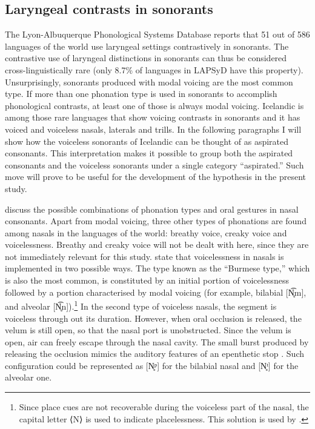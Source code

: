 \documentclass[11pt,a4paper,oneside,openany]{memoir}\usepackage[]{graphicx}\usepackage[]{color}
\begin{document}
\subsection{Laryngeal contrasts in sonorants}
The Lyon-Albuquerque Phonological Systems Database \citep{Maddieson2012} reports that 51 out of 586 languages of the world use laryngeal settings contrastively in sonorants.
The contrastive use of laryngeal distinctions in sonorants can thus be considered cross-linguistically rare (only 8.7\% of languages in LAPSyD have this property).
Unsurprisingly, sonorants produced with modal voicing are the most common type.
If more than one phonation type is used in sonorants to accomplish phonological contrasts, at least one of those is always modal voicing.
Icelandic is among those rare languages that show voicing contrasts in sonorants and it has voiced and voiceless nasals, laterals and trills.
In the following paragraphs I will show how the voiceless sonorants of Icelandic can be thought of as aspirated consonants.
This interpretation makes it possible to group both the aspirated consonants and the voiceless sonorants under a single category ``aspirated.''
Such move will prove to be useful for the development of the hypothesis in the present study.

\citet{ladefoged1996} discuss the possible combinations of phonation types and oral gestures in nasal consonants.
Apart from modal voicing, three other types of phonations are found among nasals in the languages of the world: breathy voice, creaky voice and voicelessness.
Breathy and creaky voice will not be dealt with here, since they are not immediately relevant for this study.
\citet{bhaskararao1991} state that voicelessness in nasals is implemented in two possible ways.
The type known as the ``Burmese type,'' which is also the most common, is constituted by an initial portion of voicelessness followed by a portion characterised by modal voicing (for example, bilabial [N̥͡m], and alveolar [N̥͡n]).\footnote{Since place cues are not recoverable during the voiceless part of the nasal, the capital letter ⟨N⟩ is used to indicate placelessness.
This solution is used by \citet{silverman2012}.
}
In the second type of voiceless nasals, the segment is voiceless through out its duration.
However, when oral occlusion is released, the velum is still open, so that the nasal port is unobstructed.
Since the velum is open, air can freely escape through the nasal cavity.
The small burst produced by releasing the occlusion mimics the auditory features of an epenthetic stop \citep[p. 84]{bhaskararao1991}.
Such configuration could be represented as [N̥ᵖ] for the bilabial nasal and [N̥ᵗ] for the alveolar one.
\end{document}
